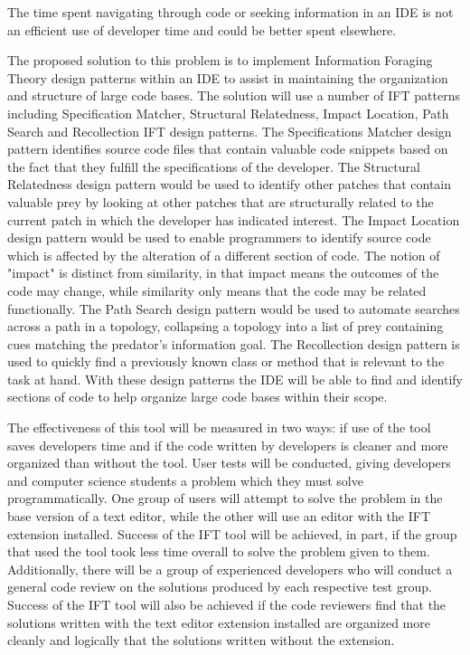 \documentclass[letterpaper,10pt,titlepage,draftclsnofoot,onecolumn] {IEEEtran}
\begin{document}
\bigskip
The time spent navigating through code or seeking information in an IDE is not an efficient use of developer time and could be better spent elsewhere.

\bigskip
The proposed solution to this problem is to implement Information Foraging Theory design patterns within an IDE to assist in maintaining the organization and structure of large code bases.
The solution will use a number of IFT patterns including Specification Matcher, Structural Relatedness, Impact Location, Path Search and Recollection IFT design patterns.
The Specifications Matcher design pattern identifies source code files that contain valuable code snippets based on the fact that they fulfill the specifications of the developer. 
The Structural Relatedness design pattern would be used to identify other patches that contain valuable prey by looking at other patches that are structurally related to the current patch in which the developer has indicated interest.
The Impact Location design pattern would be used to enable programmers to identify source code which is affected by the alteration of a different section of code. 
The notion of "impact" is distinct from similarity, in that impact means the outcomes of the code may change, while similarity only means that the code may be related functionally. 
The Path Search design pattern would be used to automate searches across a path in a topology, collapsing a topology into a list of prey containing cues matching the predator's information goal. 
The Recollection design pattern is used to quickly find a previously known class or method that is relevant to the task at hand.
With these design patterns the IDE will be able to find and identify sections of code to help organize large code bases within their scope.

\bigskip
The effectiveness of this tool will be measured in two ways: if use of the tool saves developers time and if the code written by developers is cleaner and more organized than without the tool. 
User tests will be conducted, giving developers and computer science students a problem which they must solve programmatically. 
One group of users will attempt to solve the problem in the base version of a text editor, while the other will use an editor with the IFT extension installed. 
Success of the IFT tool will be achieved, in part, if the group that used the tool took less time overall to solve the problem given to them. 
Additionally, there will be a group of experienced developers who will conduct a general code review on the solutions produced by each respective test group. 
Success of the IFT tool will also be achieved if the code reviewers find that the solutions written with the text editor extension installed are organized more cleanly and logically that the solutions written without the extension. 
\end{document}

